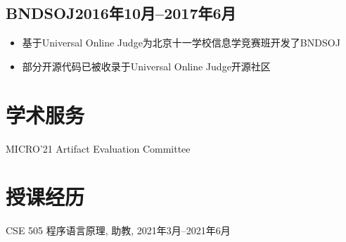 \documentclass{article}
\newcommand{\cvsubsection}[1]{\subsection*{\hspace{1.45em}#1}}
\begin{document}
\cvsubsection{BNDSOJ\hfill 2016年10月--2017年6月}
\begin{itemize}
    \setlength{\itemsep}{1pt}
    \setlength{\parskip}{0pt}
    \setlength{\parsep}{0pt}
    \item 基于Universal Online Judge为北京十一学校信息学竞赛班开发了BNDSOJ
    \item 部分开源代码已被收录于Universal Online Judge开源社区
\end{itemize}

\nocite{*}



\section*{学术服务}

MICRO'21 Artifact Evaluation Committee














\section*{授课经历}
CSE 505 程序语言原理, 助教, 2021年3月--2021年6月


\end{document}
